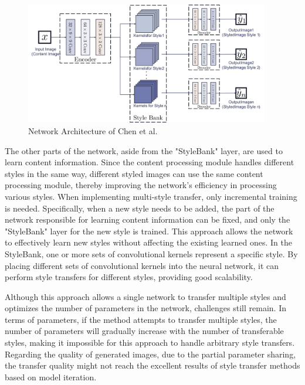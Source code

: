 \begin{figure}[!htbp]%
    \centering%
    \includegraphics[width=0.95\textwidth]{fig/Figure_7_Network_Architecture_of_Chen_et_al_[41].pdf}
    \caption{Network Architecture of Chen et al.\citep{40chen2017stylebank}}\label{fig8_Chen}
\end{figure}

The other parts of the network, aside from the "StyleBank" layer, are used to learn content information. Since the content processing module handles different styles in the same way, different styled images can use the same content processing module, thereby improving the network's efficiency in processing various styles. When implementing multi-style transfer, only incremental training is needed. Specifically, when a new style needs to be added, the part of the network responsible for learning content information can be fixed, and only the "StyleBank" layer for the new style is trained. This approach allows the network to effectively learn new styles without affecting the existing learned ones. In the StyleBank, one or more sets of convolutional kernels represent a specific style. By placing different sets of convolutional kernels into the neural network, it can perform style transfers for different styles, providing good scalability.

Although this approach allows a single network to transfer multiple styles and optimizes the number of parameters in the network, challenges still remain. In terms of parameters, if the method attempts to transfer multiple styles, the number of parameters will gradually increase with the number of transferable styles, making it impossible for this approach to handle arbitrary style transfers. Regarding the quality of generated images, due to the partial parameter sharing, the transfer quality might not reach the excellent results of style transfer methods based on model iteration.
